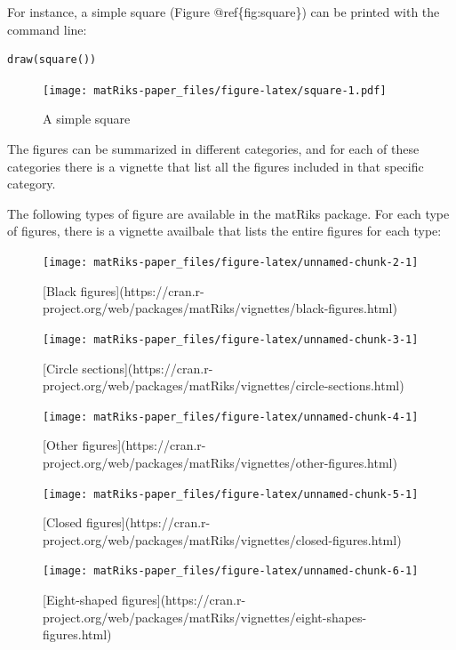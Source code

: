 For instance, a simple square (Figure @ref\{fig:square\}) can be printed with the command line:

\begin{verbatim}
draw(square())
\end{verbatim}

\begin{figure}
\centering
\texttt{[image: matRiks-paper\_files/figure-latex/square-1.pdf]}
\caption{\label{fig:square}A simple square}
\end{figure}

The figures can be summarized in different categories, and for each of these categories there is a vignette that list all the figures included in that specific category.

The following types of figure are available in the matRiks package. For each type of figures, there is a vignette availbale that lists the entire figures for each type:

\begin{figure}
\texttt{[image: matRiks-paper\_files/figure-latex/unnamed-chunk-2-1]} \caption{[Black figures](https://cran.r-project.org/web/packages/matRiks/vignettes/black-figures.html)}\label{fig:unnamed-chunk-2}
\end{figure}

\begin{figure}
\texttt{[image: matRiks-paper\_files/figure-latex/unnamed-chunk-3-1]} \caption{[Circle sections](https://cran.r-project.org/web/packages/matRiks/vignettes/circle-sections.html)}\label{fig:unnamed-chunk-3}
\end{figure}

\begin{figure}
\texttt{[image: matRiks-paper\_files/figure-latex/unnamed-chunk-4-1]} \caption{[Other figures](https://cran.r-project.org/web/packages/matRiks/vignettes/other-figures.html)}\label{fig:unnamed-chunk-4}
\end{figure}

\begin{figure}
\texttt{[image: matRiks-paper\_files/figure-latex/unnamed-chunk-5-1]} \caption{[Closed figures](https://cran.r-project.org/web/packages/matRiks/vignettes/closed-figures.html)}\label{fig:unnamed-chunk-5}
\end{figure}

\begin{figure}
\texttt{[image: matRiks-paper\_files/figure-latex/unnamed-chunk-6-1]} \caption{[Eight-shaped figures](https://cran.r-project.org/web/packages/matRiks/vignettes/eight-shapes-figures.html)}\label{fig:unnamed-chunk-6}
\end{figure}

